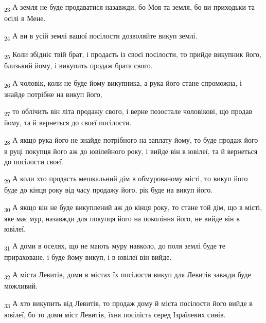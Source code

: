 \begin{tcolorbox}
\textsubscript{23} А земля не буде продаватися назавжди, бо Моя та земля, бо ви приходьки та осілі в Мене.
\end{tcolorbox}
\begin{tcolorbox}
\textsubscript{24} А ви в усій землі вашої посілости дозволяйте викуп землі.
\end{tcolorbox}
\begin{tcolorbox}
\textsubscript{25} Коли збідніє твій брат, і продасть із своєї посілости, то прийде викупник його, близький йому, і викупить продаж брата свого.
\end{tcolorbox}
\begin{tcolorbox}
\textsubscript{26} А чоловік, коли не буде йому викупника, а рука його стане спроможна, і знайде потрібне на викуп його,
\end{tcolorbox}
\begin{tcolorbox}
\textsubscript{27} то облічить він літа продажу свого, і верне позостале чоловікові, що продав йому, та й вернеться до своєї посілости.
\end{tcolorbox}
\begin{tcolorbox}
\textsubscript{28} А якщо рука його не знайде потрібного на заплату йому, то буде продаж його в руці покупця його аж до ювілейного року, і вийде він в ювілеї, та й вернеться до посілости своєї.
\end{tcolorbox}
\begin{tcolorbox}
\textsubscript{29} А коли хто продасть мешкальний дім в обмурованому місті, то викуп його буде до кінця року від часу продажу його, рік буде на викуп його.
\end{tcolorbox}
\begin{tcolorbox}
\textsubscript{30} А якщо він не буде викуплений аж до кінця року, то стане той дім, що в місті, яке має мур, назавжди для покупця його на покоління його, не вийде він в ювілеї.
\end{tcolorbox}
\begin{tcolorbox}
\textsubscript{31} А доми в оселях, що не мають муру навколо, до поля землі буде те прираховане, і буде йому викуп, і в ювілеї він вийде.
\end{tcolorbox}
\begin{tcolorbox}
\textsubscript{32} А міста Левитів, доми в містах їх посілости викуп для Левитів завжди буде можливий.
\end{tcolorbox}
\begin{tcolorbox}
\textsubscript{33} А хто викупить від Левитів, то продаж дому й міста посілости його вийде в ювілеї, бо то доми міст Левитів, їхня посілість серед Ізраїлевих синів.
\end{tcolorbox}
